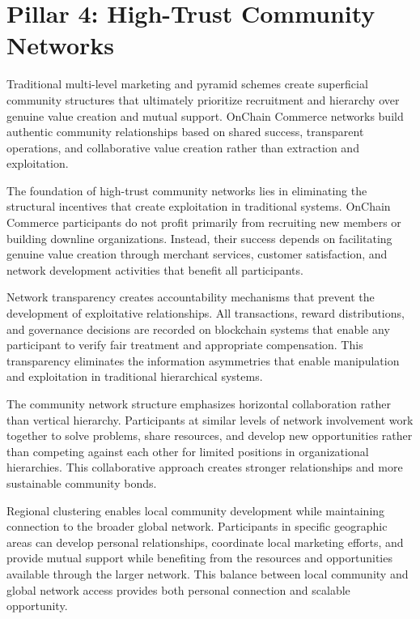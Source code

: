 \documentclass[
  Letterpaper,
]{scrbook}
\begin{document}
\section{Pillar 4: High-Trust Community
Networks}\label{pillar-4-high-trust-community-networks}

Traditional multi-level marketing and pyramid schemes create superficial
community structures that ultimately prioritize recruitment and
hierarchy over genuine value creation and mutual support. OnChain
Commerce networks build authentic community relationships based on
shared success, transparent operations, and collaborative value creation
rather than extraction and exploitation.

The foundation of high-trust community networks lies in eliminating the
structural incentives that create exploitation in traditional systems.
OnChain Commerce participants do not profit primarily from recruiting
new members or building downline organizations. Instead, their success
depends on facilitating genuine value creation through merchant
services, customer satisfaction, and network development activities that
benefit all participants.

Network transparency creates accountability mechanisms that prevent the
development of exploitative relationships. All transactions, reward
distributions, and governance decisions are recorded on blockchain
systems that enable any participant to verify fair treatment and
appropriate compensation. This transparency eliminates the information
asymmetries that enable manipulation and exploitation in traditional
hierarchical systems.

The community network structure emphasizes horizontal collaboration
rather than vertical hierarchy. Participants at similar levels of
network involvement work together to solve problems, share resources,
and develop new opportunities rather than competing against each other
for limited positions in organizational hierarchies. This collaborative
approach creates stronger relationships and more sustainable community
bonds.

Regional clustering enables local community development while
maintaining connection to the broader global network. Participants in
specific geographic areas can develop personal relationships, coordinate
local marketing efforts, and provide mutual support while benefiting
from the resources and opportunities available through the larger
network. This balance between local community and global network access
provides both personal connection and scalable opportunity.
\end{document}
